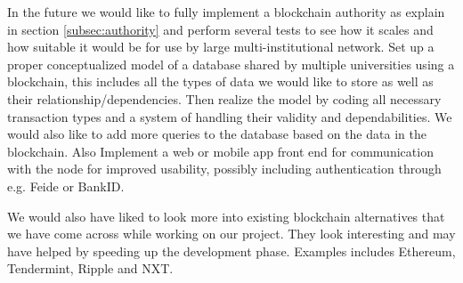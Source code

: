 \documentclass[12pt]{article}
\begin{document}
In the future we would like to fully implement a blockchain authority as explain in section \ref{subsec:authority} and perform several tests to see how it scales and how suitable it would be for use by large multi-institutional network. Set up a proper conceptualized model of a database shared by multiple universities using a blockchain, this includes all the types of data we would like to store as well as their relationship/dependencies. Then realize the model by coding all necessary transaction types and a system of handling their validity and dependabilities. We would also like to add more queries to the database based on the data in the blockchain. Also Implement a web or mobile app front end for communication with the node for improved usability, possibly including authentication through e.g. Feide or BankID.

We would also have liked to look more into existing blockchain alternatives  that we have come across while working on our project. They look interesting and may have helped by speeding up the development phase. Examples includes Ethereum\cite{ethereum2016}, Tendermint\cite{tendermint2016}, Ripple\cite{ripple2016} and NXT\cite{nxt2016}.

\newpage
 

\listoffigures
\end{document}

